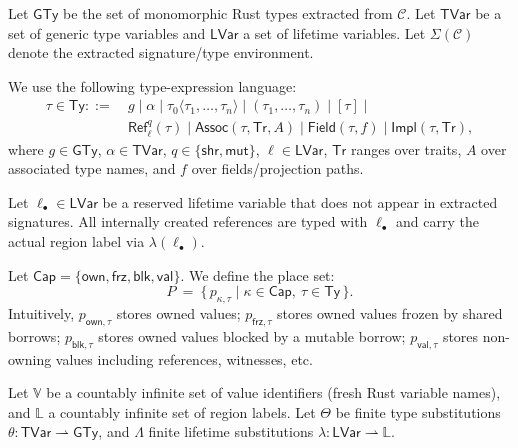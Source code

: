 \documentclass[sigconf]{acmart}
\begin{document}
Let $\mathsf{GTy}$ be the set of monomorphic Rust types extracted from $\mathcal{C}$. Let $\mathsf{TVar}$ be a set of generic type variables and $\mathsf{LVar}$ a set of lifetime variables. Let $\Sigma(\mathcal{C})$ denote the extracted signature/type environment.

We use the following type-expression language:
\begin{align*}
\tau \in \mathsf{Ty} ::=~&
g \mid \alpha \mid \tau_0\langle \tau_1,\dots,\tau_n\rangle \mid (\tau_1,\dots,\tau_n) \mid [\tau] \mid \\
& \mathsf{Ref}^q_{\ell}(\tau) \mid \mathsf{Assoc}(\tau,\mathsf{Tr},A) \mid \mathsf{Field}(\tau,f) \mid \mathsf{Impl}(\tau,\mathsf{Tr}),
\end{align*}
where $g\in\mathsf{GTy}$, $\alpha\in\mathsf{TVar}$, $q\in\{\mathsf{shr},\mathsf{mut}\}$,
$\ell\in\mathsf{LVar}$, $\mathsf{Tr}$ ranges over traits, $A$ over associated type names, and $f$ over fields/projection paths.

Let $\ell_{\bullet}\in \mathsf{LVar}$ be a reserved lifetime variable that does not appear in extracted signatures.
All internally created references are typed with $\ell_{\bullet}$ and carry the actual region label via $\lambda(\ell_{\bullet})$.

Let $\mathsf{Cap}=\{\mathsf{own},\mathsf{frz},\mathsf{blk},\mathsf{val}\}$.
We define the place set:
\[
P ~=~ \{\, p_{\kappa,\tau} \mid \kappa\in\mathsf{Cap},~ \tau\in\mathsf{Ty} \,\}.
\]
Intuitively, $p_{\mathsf{own},\tau}$ stores owned values;
$p_{\mathsf{frz},\tau}$ stores owned values frozen by shared borrows;
$p_{\mathsf{blk},\tau}$ stores owned values blocked by a mutable borrow;
$p_{\mathsf{val},\tau}$ stores non-owning values including references, witnesses, etc.

Let $\mathbb{V}$ be a countably infinite set of value identifiers (fresh Rust variable names),
and $\mathbb{L}$ a countably infinite set of region labels.
Let $\Theta$ be finite type substitutions $\theta:\mathsf{TVar}\rightharpoonup \mathsf{GTy}$,
and $\Lambda$ finite lifetime substitutions $\lambda:\mathsf{LVar}\rightharpoonup \mathbb{L}$.
\end{document}
